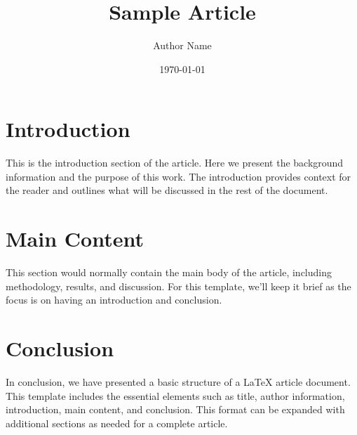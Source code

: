 \documentclass{article}
\title{Sample Article}
\author{Author Name}
\date{\today}
\begin{document}
\maketitle

\section{Introduction}
This is the introduction section of the article. Here we present the background information and the purpose of this work. The introduction provides context for the reader and outlines what will be discussed in the rest of the document.

\section{Main Content}
This section would normally contain the main body of the article, including methodology, results, and discussion. For this template, we'll keep it brief as the focus is on having an introduction and conclusion.

\section{Conclusion}
In conclusion, we have presented a basic structure of a LaTeX article document. This template includes the essential elements such as title, author information, introduction, main content, and conclusion. This format can be expanded with additional sections as needed for a complete article.
\end{document}
